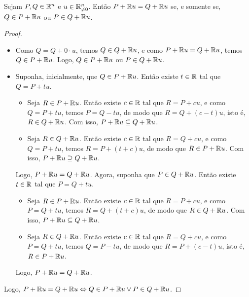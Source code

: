 \begin{proposition} 
    Sejam $P, Q \in \mathbb{R}^n$ e $u \in \mathbb{R}^n_{\neq 0}$. Então $P + \mathbb{R} u = Q + \mathbb{R} u$ se, e somente se, $Q \in P + \mathbb{R} u$ ou $P \in Q + \mathbb{R} u$.
\end{proposition}

\begin{proof}
    \leavevmode
        \begin{itemize}[align=left]
            \item[($\Rightarrow$)] Como $Q = Q + 0 \cdot u$, temos $Q \in Q + \mathbb{R} u$, e como $P + \mathbb{R} u = Q + \mathbb{R} u$, temos $Q \in P + \mathbb{R} u$. Logo, $Q \in P + \mathbb{R} u$ ou $P \in Q + \mathbb{R} u$.
            \item[($\Leftarrow$)] Suponha, inicialmente, que $Q \in P + \mathbb{R} u$. Então existe $t \in \mathbb{R}$ tal que $Q = P + tu$. 
                \begin{itemize}
                    \item[($\subseteq$)] Seja $R \in P + \mathbb{R} u$. Então existe $c \in \mathbb{R}$ tal que $R = P + cu$, e como $Q = P + tu$, temos $P = Q-tu$, de modo que $R = Q + (c-t)u$, isto é, $R \in Q + \mathbb{R} u$. Com isso, $P + \mathbb{R} u \subseteq Q + \mathbb{R} u$.
                    \item[($\supseteq$)] Seja $R \in Q + \mathbb{R} u$. Então existe $c \in \mathbb{R}$ tal que $R = Q + cu$, e como $Q = P + tu$, temos $R = P + (t+c)u$, de modo que $R \in P + \mathbb{R} u$. Com isso, $P + \mathbb{R} u \supseteq Q + \mathbb{R} u$.
                \end{itemize}
            Logo, $P + \mathbb{R} u = Q + \mathbb{R} u$. Agora, suponha que $P \in Q + \mathbb{R} u$. Então existe $t \in \mathbb{R}$ tal que $P = Q + tu$. 
                \begin{itemize}
                    \item[($\subseteq$)] Seja $R \in P + \mathbb{R} u$. Então existe $c \in \mathbb{R}$ tal que $R = P + cu$, e como $P = Q + tu$, temos $R = Q + (t+c)u$, de modo que $R \in Q + \mathbb{R} u$. Com isso, $P + \mathbb{R} u \subseteq Q + \mathbb{R} u$.
                    \item[($\supseteq$)] Seja $R \in Q + \mathbb{R} u$. Então existe $c \in \mathbb{R}$ tal que $R = Q + cu$, e como $P = Q + tu$, temos $Q = P-tu$, de modo que $R = P + (c-t)u$, isto é, $R \in P + \mathbb{R} u$.
                \end{itemize}
            Logo, $P + \mathbb{R} u = Q + \mathbb{R} u$.
        \end{itemize}
    Logo, $P + \mathbb{R} u = Q + \mathbb{R} u \Leftrightarrow Q \in P + \mathbb{R} u \lor P \in Q + \mathbb{R} u$. \blackproof
\end{proof}

